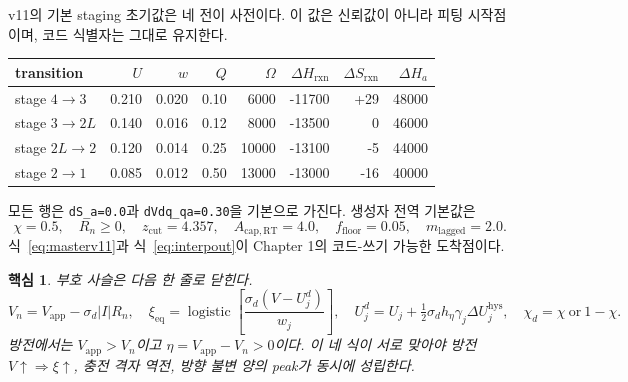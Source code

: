 \documentclass[11pt,a4paper]{article}
\newtheorem*{keybox}{핵심}
\newcommand{\eq}{\mathrm{eq}}
\newcommand{\app}{\mathrm{app}}
\newcommand{\hys}{\mathrm{hys}}
\newcommand{\lag}{\mathrm{lagged}}
\begin{document}
v11의 기본 staging 초기값은 네 전이 사전이다. 이 값은 신뢰값이 아니라 피팅 시작점이며, 코드 식별자는 그대로 유지한다.
\begin{center}
\renewcommand{\arraystretch}{1.22}
\begin{tabular}{lrrrrrrr}
\toprule
transition & $U$ & $w$ & $Q$ & $\Omega$ & $\Delta H_{\mathrm{rxn}}$ & $\Delta S_{\mathrm{rxn}}$ & $\Delta H_a$\\
\midrule
stage $4\to3$ & 0.210 & 0.020 & 0.10 & 6000 & -11700 & +29 & 48000\\
stage $3\to2L$ & 0.140 & 0.016 & 0.12 & 8000 & -13500 & 0 & 46000\\
stage $2L\to2$ & 0.120 & 0.014 & 0.25 & 10000 & -13100 & -5 & 44000\\
stage $2\to1$ & 0.085 & 0.012 & 0.50 & 13000 & -13000 & -16 & 40000\\
\bottomrule
\end{tabular}
\end{center}
모든 행은 \texttt{dS\_a=0.0}과 \texttt{dVdq\_qa=0.30}을 기본으로 가진다. 생성자 전역 기본값은
\begin{equation}
\chi=0.5,\quad R_n\ge0,\quad
z_{\mathrm{cut}}=4.357,\quad A_{\mathrm{cap,RT}}=4.0,\quad
f_{\mathrm{floor}}=0.05,\quad
m_{\lag}=2.0.
\label{eq:defaults}
\end{equation}
식~\eqref{eq:masterv11}과 식~\eqref{eq:interpout}이 Chapter 1의 코드-쓰기 가능한 도착점이다.

\begin{keybox}
부호 사슬은 다음 한 줄로 닫힌다.
\[
V_n=V_{\app}-\sigma_d|I|R_n,\quad
\xi_{\eq}=\operatorname{logistic}\!\left[\frac{\sigma_d(V-U_j^d)}{w_j}\right],\quad
U_j^d=U_j+\tfrac12\sigma_d h_\eta\gamma_j\Delta U_j^{\hys},\quad
\chi_d=\chi\ \text{or}\ 1-\chi.
\]
방전에서는 $V_{\app}>V_n$이고 $\eta=V_{\app}-V_n>0$이다. 이 네 식이 서로 맞아야 방전 $V\uparrow\Rightarrow\xi\uparrow$, 충전 격자 역전, 방향 불변 양의 peak가 동시에 성립한다.
\end{keybox}
\end{document}
